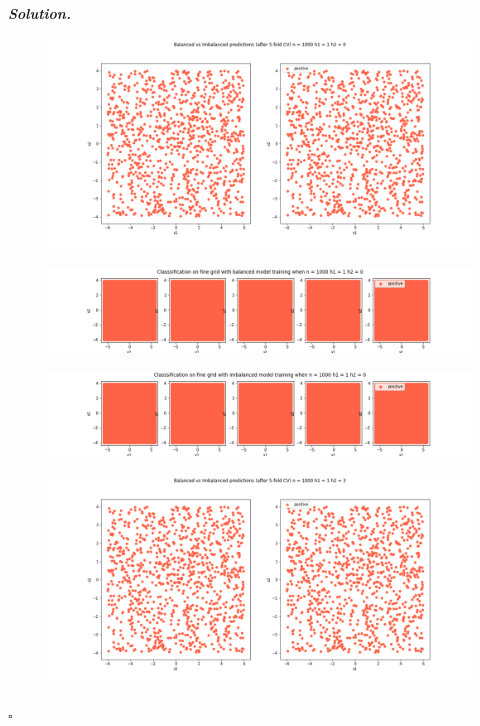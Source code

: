 \documentclass[10pt]{article}
\newenvironment{solution}[1][\it{Solution}]{\textbf{#1. } }{$\square$}
\begin{document}
\begin{solution}
\begin{figure}[H]
\end{figure}
\begin{figure}[H]
\includegraphics[width=16cm, keepaspectratio]{./3/19}
\end{figure}
\begin{figure}[H]
\includegraphics[width=16cm, keepaspectratio]{./3/20}
\end{figure}
\begin{figure}[H]
\includegraphics[width=16cm, keepaspectratio]{./3/21}
\end{figure}
\begin{figure}[H]
\includegraphics[width=16cm, keepaspectratio]{./3/22}
\end{figure}

\end{solution}
\end{document}
